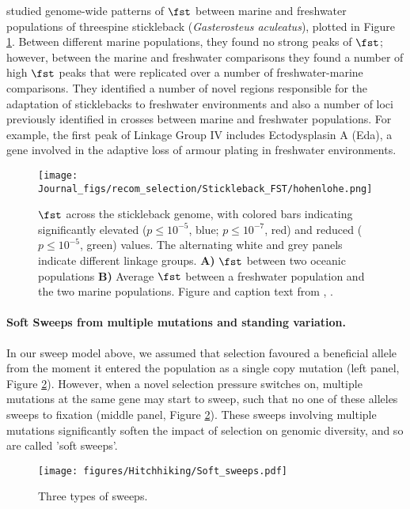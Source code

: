 \citet{hohenlohe2010population} studied genome-wide patterns of
$\fst$ between marine and freshwater populations of  threespine
stickleback ({\it Gasterosteus aculeatus}), plotted in Figure \ref{fig:local_sweep_stickleback}. 
Between different marine populations, they found no strong peaks of $\fst$;
however, between the marine and freshwater comparisons they found a
number of high $\fst$  peaks that were replicated over a number of
freshwater-marine comparisons. They identified a number of novel
regions responsible for the adaptation of sticklebacks to freshwater
environments and also a number of loci previously identified in crosses between marine and freshwater populations. For example, the first peak of Linkage
Group IV includes Ectodysplasin A (Eda), a gene involved in the adaptive loss of armour plating in freshwater environments.
\begin{figure}
\begin{center}
\texttt{[image: Journal\_figs/recom\_selection/Stickleback\_FST/hohenlohe.png]}
\end{center}
\caption{$\fst$ across the stickleback genome, with colored bars indicating
  significantly elevated ($p \leq 10^{−5}$, blue; $p \leq 10^{−7}$,
  red) and reduced ($p \leq 10^{−5}$, green) values. The alternating
  white and grey panels indicate different linkage groups. {\bf A)} $\fst$
  between two oceanic populations {\bf B)} Average $\fst$ between a
  freshwater population and the two marine populations. Figure and
  caption text from \citet{hohenlohe2010population}, \PLOSccBY.} \label{fig:local_sweep_stickleback}
\end{figure}


\paragraph{Soft Sweeps from multiple mutations and standing variation.}
In our sweep model above, we assumed that selection favoured a
beneficial allele from the moment it entered the population as a
single copy mutation  (left panel, Figure \ref{fig:soft_sweep_haps}). However, when a novel selection pressure
switches on, multiple mutations at the same gene
may start to sweep, such that no one of these alleles sweeps
to fixation (middle panel, Figure \ref{fig:soft_sweep_haps}). These sweeps involving multiple mutations significantly
soften the impact of selection on genomic diversity, and so are called 'soft sweeps'.

\begin{figure}
\begin{center}
\texttt{[image: figures/Hitchhiking/Soft\_sweeps.pdf]}
\end{center}
\caption{Three types of sweeps. } \label{fig:soft_sweep_haps}
\end{figure}

